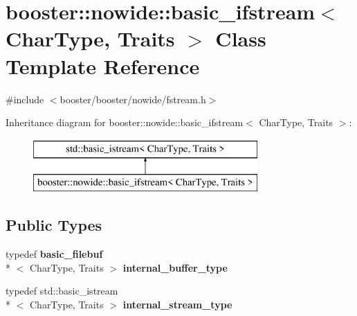 \section{booster\-:\-:nowide\-:\-:basic\-\_\-ifstream$<$ Char\-Type, Traits $>$ Class Template Reference}
\label{classbooster_1_1nowide_1_1basic__ifstream}


{\ttfamily \#include $<$booster/booster/nowide/fstream.\-h$>$}

Inheritance diagram for booster\-:\-:nowide\-:\-:basic\-\_\-ifstream$<$ Char\-Type, Traits $>$\-:\begin{figure}[H]
\begin{center}
\leavevmode
\includegraphics[height=2.000000cm]{classbooster_1_1nowide_1_1basic__ifstream}
\end{center}
\end{figure}
\subsection*{Public Types}
\begin{DoxyCompactItemize}
\item 
typedef {\bf basic\-\_\-filebuf}\\*
$<$ Char\-Type, Traits $>$ {\bfseries internal\-\_\-buffer\-\_\-type}\label{classbooster_1_1nowide_1_1basic__ifstream_a69bfa84177d7a4d357958164a2015b3c}

\item 
typedef std\-::basic\-\_\-istream\\*
$<$ Char\-Type, Traits $>$ {\bfseries internal\-\_\-stream\-\_\-type}\label{classbooster_1_1nowide_1_1basic__ifstream_a9baee407ad1c3fd5ac837b206ed122c8}

\end{DoxyCompactItemize}

